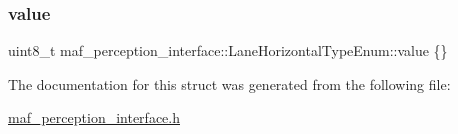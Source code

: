 \subsubsection{\texorpdfstring{value}{value}}
{\footnotesize\ttfamily uint8\+\_\+t maf\+\_\+perception\+\_\+interface\+::\+Lane\+Horizontal\+Type\+Enum\+::value \{\}}



The documentation for this struct was generated from the following file\+:\begin{DoxyCompactItemize}
\item 
\hyperlink{maf__perception__interface_8h}{maf\+\_\+perception\+\_\+interface.\+h}\end{DoxyCompactItemize}
